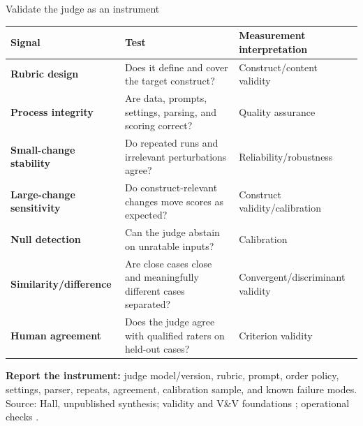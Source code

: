 \documentclass[aspectratio=169]{beamer}
\newcommand{\slidesource}[1]{\vfill\tiny\color{hrgray}Source: #1.}
\begin{document}
\begin{frame}{Validate the judge as an instrument}
\scriptsize
\renewcommand{\arraystretch}{.92}
\begin{tabularx}{\textwidth}{>{\bfseries}p{}Y Y}
\toprule
Signal & Test & Measurement interpretation\\
\midrule
Rubric design & Does it define and cover the target construct? & Construct/content validity\\
Process integrity & Are data, prompts, settings, parsing, and scoring correct? & Quality assurance\\
Small-change stability & Do repeated runs and irrelevant perturbations agree? & Reliability/robustness\\
Large-change sensitivity & Do construct-relevant changes move scores as expected? & Construct validity/calibration\\
Null detection & Can the judge abstain on unratable inputs? & Calibration\\
Similarity/difference & Are close cases close and meaningfully different cases separated? & Convergent/discriminant validity\\
Human agreement & Does the judge agree with qualified raters on held-out cases? & Criterion validity\\
\bottomrule
\end{tabularx}
\vspace{.25em}
\textbf{Report the instrument:} judge model/version, rubric, prompt, order policy, settings, parser, repeats, agreement, calibration sample, and known failure modes.
\slidesource{Hall, unpublished synthesis; validity and V\&V foundations \parencite{messick1987validity,cronbach1955construct,campbell1959convergent,nasa2017handbook,ieee1012-2024}; operational checks \parencite{alvarezmelis2018robustness,yeh2019infidelity,adebayo2018sanity,geifman2017selective,artstein2008intercoder,zheng2023judging}}
\end{frame}
\end{document}
